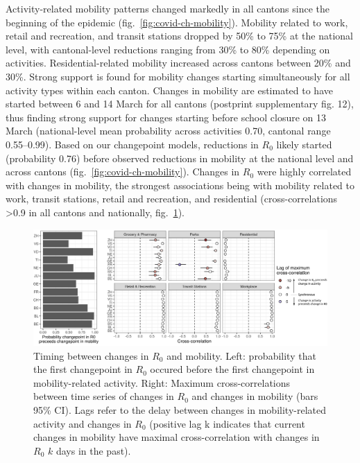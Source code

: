 Activity-related mobility patterns changed markedly in all cantons since the beginning of the epidemic (fig.~\ref{fig:covid-ch-mobility}). Mobility related to work, retail and recreation, and transit stations dropped by 50\% to 75\% at the national level, with cantonal-level reductions ranging from 30\% to 80\% depending on activities. Residential-related mobility increased across cantons between 20\% and 30\%. Strong support is found for mobility changes starting simultaneously for all activity types within each canton. Changes in mobility are estimated to have started between 6 and 14 March for all cantons (postprint supplementary fig. 12), thus finding strong support for changes starting before school closure on 13 March (national-level mean probability across activities 0.70, cantonal range 0.55–0.99). Based on our changepoint models, reductions in $R_0$ likely started (probability 0.76) before observed reductions in mobility at the national level and across cantons (fig.~\ref{fig:covid-ch-mobility}). Changes in $R_0$ were highly correlated with changes in mobility, the strongest associations being with mobility related to work, transit stations, retail and recreation, and residential (cross-correlations >0.9 in all cantons and nationally, fig.~\ref{fig:covid-ch-timing}). 
\begin{figure}\centering
  \includegraphics[width=\textwidth]{fig_covid-switzerland-npi/FIGURE_4.png}
  \caption[Timing between changes in $R_0$ and mobility]{Timing between changes in $R_0$ and mobility. Left: probability that the first changepoint in $R_0$ occured before the first changepoint in mobility-related activity. Right: Maximum cross-correlations between time series of changes in $R_0$ and changes in mobility (bars 95\% CI). Lags refer to the delay between changes in mobility-related activity and changes in $R_0$ (positive lag k indicates that current changes in mobility have maximal cross-correlation with changes in $R_0$ $k$ days in the past).}
  \label{fig:covid-ch-timing}
\end{figure}

